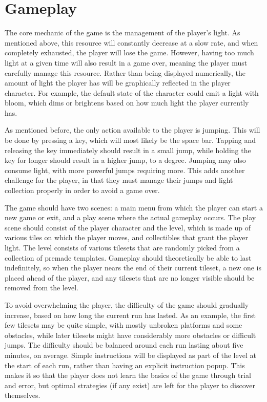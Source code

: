 \documentclass[10pt]{article}
\begin{document}
\pagebreak

\section{Gameplay}

The core mechanic of the game is the management of the player's light. As mentioned above, this resource will constantly decrease at a slow rate,
and when completely exhausted, the player will lose the game. However, having too much light at a given time will also result in a game over,
meaning the player must carefully manage this resource. Rather than being displayed numerically, the amount of light the player has will be
graphically reflected in the player character. For example, the default state of the character could emit a light with bloom, which dims
or brightens based on how much light the player currently has.

As mentioned before, the only action available to the player is jumping. This will be done by pressing a key, which will most likely be the space bar.
Tapping and releasing the key immediately should result in a small jump, while holding the key for longer should result in a higher jump, to a degree.
Jumping may also consume light, with more powerful jumps requiring more. This adds another challenge for the player, in that they must manage their jumps
and light collection properly in order to avoid a game over.

The game should have two scenes: a main menu from which the player can start a new game or exit, and a play scene where the actual gameplay occurs.
The play scene should consist of the player character and the level, which is made up of various tiles on which the player moves, and collectibles
that grant the player light. The level consists of various tilesets that are randomly picked from a collection of premade templates. Gameplay should
theoretically be able to last indefinitely, so when the player nears the end of their current tileset, a new one is placed ahead of the player,
and any tilesets that are no longer visible should be removed from the level.

To avoid overwhelming the player, the difficulty of the game should gradually increase, based on how long the current run has lasted.
As an example, the first few tilesets may be quite simple, with mostly unbroken platforms and some obstacles, while later tilesets
might have considerably more obstacles or difficult jumps. The difficulty should be balanced around each run lasting about five minutes, on average.
Simple instructions will be displayed as part of the level at the start of each run, rather than having an explicit instruction popup.
This makes it so that the player does not learn the basics of the game through trial and error, but optimal strategies (if any exist)
are left for the player to discover themselves.
\end{document}
